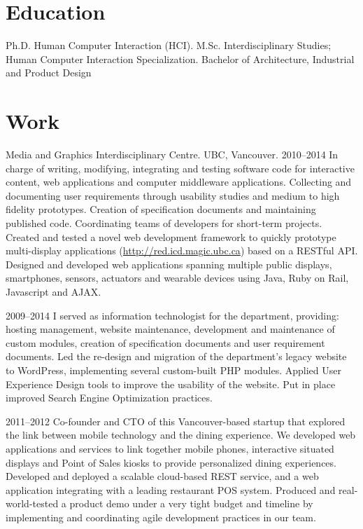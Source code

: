 \documentclass[full]{rvca}
\begin{document}
\section{Education}
Ph.D. Human Computer Interaction (HCI).
M.Sc. Interdisciplinary Studies;\\Human Computer Interaction Specialization.
Bachelor of Architecture, Industrial and Product Design

\section{Work}


\workitem
{Media and Graphics Interdisciplinary Centre. UBC, Vancouver.}%
{2010--2014}%
{In charge of writing, modifying, integrating and testing software code for interactive content, web applications and computer middleware applications. Collecting and documenting user requirements through usability studies and medium to high fidelity prototypes. Creation of specification documents and maintaining published code. Coordinating teams of developers for short-term projects.}%
{Created and tested a novel web development framework to quickly prototype multi-display applications (\href{http://red.icd.magic.ubc.ca}{http://red.icd.magic.ubc.ca}) based on a RESTful API.}%
{Designed and developed web applications spanning multiple public displays, smartphones, sensors, actuators and wearable devices using Java, Ruby on Rail, Javascript and AJAX.}

{2009--2014}
{I served as information technologist for the department, providing: hosting management, website maintenance, development and maintenance of custom modules, creation of specification documents and user requirement documents.}
{Led the re-design and migration of the department's legacy website to WordPress, implementing several custom-built PHP modules.}
{Applied User Experience Design tools to improve the usability of the website. Put in place improved Search Engine Optimization practices.}

\newpage

{2011--2012}
{Co-founder and CTO of this Vancouver-based startup that explored the link between mobile technology and the dining experience. We developed web applications and services to link together mobile phones, interactive situated displays and Point of Sales kiosks to provide personalized dining experiences.}
{Developed and deployed a scalable cloud-based REST service, and a web application integrating with a leading restaurant POS system.}
{Produced and real-world-tested a product demo under a very tight budget and timeline by  implementing and coordinating agile development practices in our team.}
\end{document}
